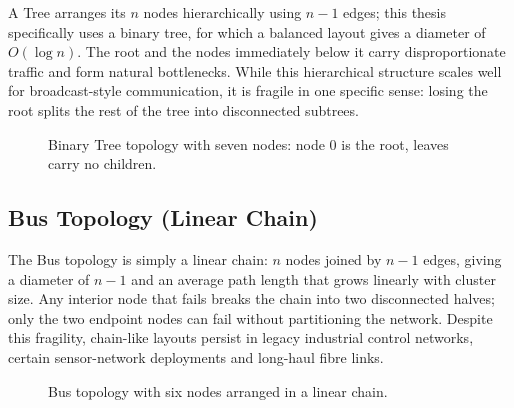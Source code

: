 A Tree arranges its $n$ nodes hierarchically using $n-1$ edges; this thesis specifically uses a binary tree, for which a balanced layout gives a diameter of $O(\log n)$. The root and the nodes immediately below it carry disproportionate traffic and form natural bottlenecks. While this hierarchical structure scales well for broadcast-style communication, it is fragile in one specific sense: losing the root splits the rest of the tree into disconnected subtrees.

\begin{figure}[H]
\centering
{}
\caption{Binary Tree topology with seven nodes: node 0 is the root, leaves carry no children.}
\label{fig:topo_tree}
\end{figure}

\subsection{Bus Topology (Linear Chain)}

The Bus topology is simply a linear chain: $n$ nodes joined by $n-1$ edges, giving a diameter of $n-1$ and an average path length that grows linearly with cluster size. Any interior node that fails breaks the chain into two disconnected halves; only the two endpoint nodes can fail without partitioning the network. Despite this fragility, chain-like layouts persist in legacy industrial control networks, certain sensor-network deployments and long-haul fibre links.

\begin{figure}[H]
\centering
{}
\caption{Bus topology with six nodes arranged in a linear chain.}
\label{fig:topo_bus}
\end{figure}

